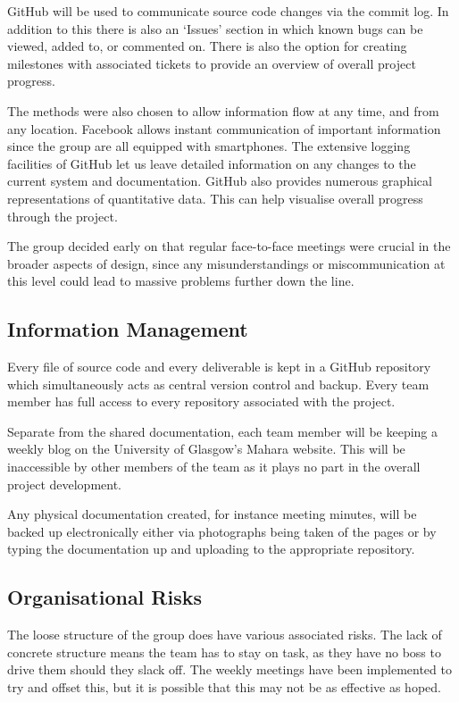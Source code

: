 GitHub will be used to communicate source code changes via the commit log. In
addition to this there is also an `Issues' section in which known bugs can be
viewed, added to, or commented on. There is also the option for creating
milestones with associated tickets to provide an overview of overall project
progress.

The methods were also chosen to allow information flow at any time, and from
any location. Facebook allows instant communication of important information
since the group are all equipped with smartphones. The extensive logging
facilities of GitHub let us leave detailed information on any changes to the
current system and documentation. GitHub also provides numerous graphical
representations of quantitative data. This can help visualise overall
progress through the project.

The group decided early on that regular face-to-face meetings were crucial
in the broader aspects of design, since any misunderstandings or
miscommunication at this level could lead to massive problems further down
the line.

\subsection{Information Management}

Every file of source code and every deliverable is kept in a GitHub repository
which simultaneously acts as central version control and backup. Every
team member has full access to every repository associated with the project.

Separate from the shared documentation, each team member will be keeping a
weekly blog on the University of Glasgow's Mahara website. This will be
inaccessible by other members of the team as it plays no part in the overall
project development.

Any physical documentation created, for instance meeting minutes, will be
backed up electronically either via photographs being taken of the pages or
by typing the documentation up and uploading to the appropriate repository.

\subsection{Organisational Risks}

The loose structure of the group does have various associated risks. The
lack of concrete structure means the team has to stay on task, as they
have no boss to drive them should they slack off. The weekly meetings
have been implemented to try and offset this, but it is possible that this
may not be as effective as hoped.

